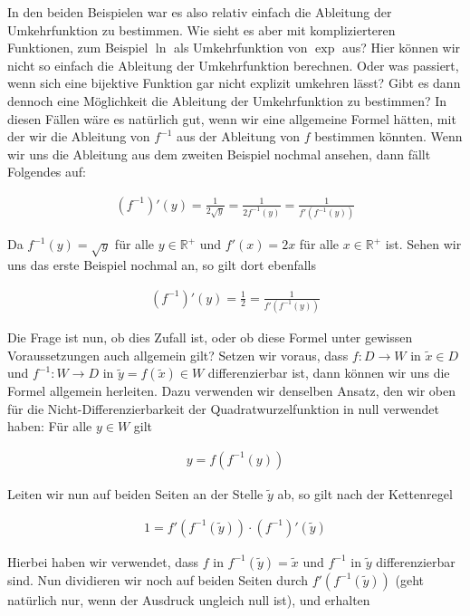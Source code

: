 \documentclass[fontsize=9pt,
               parskip=half-,
               DIV=14,
               listof=chapterentry,
               tocflat]{scrbook}
\begin{document}
In den beiden Beispielen war es also relativ einfach die Ableitung der Umkehrfunktion zu bestimmen. Wie sieht es aber mit komplizierteren Funktionen, zum Beispiel $\ln $ als Umkehrfunktion von $\exp $ aus? Hier können wir nicht so einfach die Ableitung der Umkehrfunktion berechnen. Oder was passiert, wenn sich eine bijektive Funktion gar nicht explizit umkehren lässt? Gibt es dann dennoch eine Möglichkeit die Ableitung der Umkehrfunktion zu bestimmen? In diesen Fällen wäre es natürlich gut, wenn wir eine allgemeine Formel hätten, mit der wir die Ableitung von $f^{-1}$ aus der Ableitung von $f$ bestimmen könnten. Wenn wir uns die Ableitung aus dem zweiten Beispiel nochmal ansehen, dann fällt Folgendes auf:

\begin{align*}
(f^{-1})'(y)={\tfrac {1}{2{\sqrt {y}}}}={\tfrac {1}{2f^{-1}(y)}}={\tfrac {1}{f'(f^{-1}(y))}}
\end{align*}

Da $f^{-1}(y)={\sqrt {y}}$ für alle $y\in \mathbb {R} ^{+}$ und $f'(x)=2x$ für alle $x\in \mathbb {R} ^{+}$ ist. Sehen wir uns das erste Beispiel nochmal an, so gilt dort ebenfalls

\begin{align*}
(f^{-1})'(y)={\tfrac {1}{2}}={\tfrac {1}{f'(f^{-1}(y))}}
\end{align*}

Die Frage ist nun, ob dies Zufall ist, oder ob diese Formel unter gewissen Voraussetzungen auch allgemein gilt? Setzen wir voraus, dass $f:D\to W$ in ${\tilde {x}}\in D$ und $f^{-1}:W\to D$ in ${\tilde {y}}=f({\tilde {x}})\in W$ differenzierbar ist, dann können wir uns die Formel allgemein herleiten. Dazu verwenden wir denselben Ansatz, den wir oben für die Nicht-Differenzierbarkeit der Quadratwurzelfunktion in null verwendet haben: Für alle $y\in W$ gilt

\begin{align*}
y=f(f^{-1}(y))
\end{align*}

Leiten wir nun auf beiden Seiten an der Stelle ${\tilde {y}}$ ab, so gilt nach der Kettenregel

\begin{align*}
1=f'(f^{-1}({\tilde {y}}))\cdot (f^{-1})'({\tilde {y}})
\end{align*}

Hierbei haben wir verwendet, dass $f$ in $f^{-1}({\tilde {y}})={\tilde {x}}$ und $f^{-1}$ in ${\tilde {y}}$ differenzierbar sind. Nun dividieren wir noch auf beiden Seiten durch $f'(f^{-1}({\tilde {y}}))$ (geht natürlich nur, wenn der Ausdruck ungleich null ist), und erhalten
\end{document}
